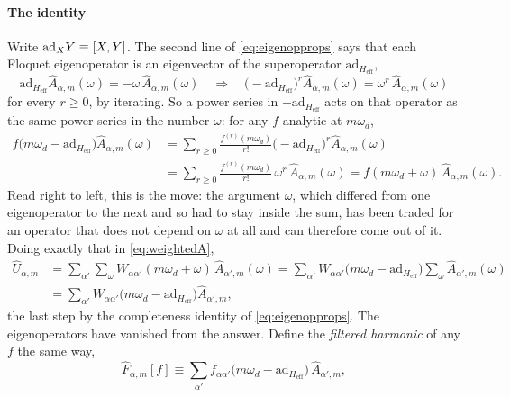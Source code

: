 \documentclass[a4paper,11pt]{article}
\newcommand{\eff}{\mathrm{eff}}
\newcommand{\ad}{\mathrm{ad}}
\begin{document}
\paragraph{The identity}
Write $\ad_X Y \equiv \comm{X}{Y}$. The second line of \eqref{eq:eigenopprops} says that each Floquet eigenoperator is an eigenvector of the superoperator $\ad_{H_\eff}$,
\begin{equation}\label{eq:adeigen}
  \ad_{H_\eff}\hat A_{\alpha,m}(\omega) = -\omega\,\hat A_{\alpha,m}(\omega)
  \quad\Longrightarrow\quad
  \big(-\ad_{H_\eff}\big)^{r}\hat A_{\alpha,m}(\omega) = \omega^{r}\,\hat A_{\alpha,m}(\omega)
\end{equation}
for every $r\ge0$, by iterating. So a power series in $-\ad_{H_\eff}$ acts on that operator as the same power series in the number $\omega$: for any $f$ analytic at $m\omega_d$,
\begin{equation}\label{eq:functional-identity}
  \begin{aligned}
  f\big(m\omega_d - \ad_{H_\eff}\big)\hat A_{\alpha,m}(\omega)
  &= \sum_{r\ge0}\frac{f^{(r)}(m\omega_d)}{r!}\big(-\ad_{H_\eff}\big)^{r}\hat A_{\alpha,m}(\omega)\\
  &= \sum_{r\ge0}\frac{f^{(r)}(m\omega_d)}{r!}\,\omega^{r}\,\hat A_{\alpha,m}(\omega)
  = f(m\omega_d+\omega)\,\hat A_{\alpha,m}(\omega).
  \end{aligned}
\end{equation}
Read right to left, this is the move: the argument $\omega$, which differed from one eigenoperator to the next and so had to stay inside the sum, has been traded for an operator that does not depend on $\omega$ at all and can therefore come out of it. Doing exactly that in \eqref{eq:weightedA},
\begin{equation}\label{eq:filtered-derivation}
  \begin{aligned}
  \hat U_{\alpha,m}
  &= \sum_{\alpha'}\sum_\omega W_{\alpha\alpha'}(m\omega_d+\omega)\,\hat A_{\alpha',m}(\omega)
  = \sum_{\alpha'} W_{\alpha\alpha'}\big(m\omega_d - \ad_{H_\eff}\big)\sum_\omega \hat A_{\alpha',m}(\omega)\\
  &= \sum_{\alpha'} W_{\alpha\alpha'}\big(m\omega_d - \ad_{H_\eff}\big)\hat A_{\alpha',m},
  \end{aligned}
\end{equation}
the last step by the completeness identity of \eqref{eq:eigenopprops}. The eigenoperators have vanished from the answer. Define the \emph{filtered harmonic} of any $f$ the same way,
\begin{equation}\label{eq:filtered-harmonic}
  \hat F_{\alpha,m}[f] \equiv \sum_{\alpha'} f_{\alpha\alpha'}\big(m\omega_d - \ad_{H_\eff}\big)\,\hat A_{\alpha',m},
\end{equation}
\end{document}
